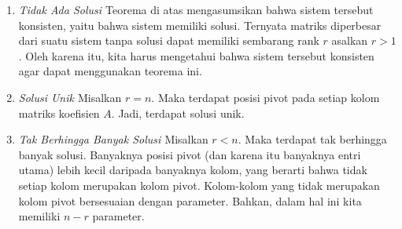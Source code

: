 \begin{enumerate}
\item {\em Tidak Ada Solusi \em}
Teorema di atas mengasumsikan bahwa sistem tersebut konsisten, yaitu bahwa sistem memiliki solusi. Ternyata matriks
diperbesar dari suatu sistem tanpa solusi dapat memiliki sembarang rank $r$ asalkan $r>1$. Oleh karena itu, kita harus mengetahui
bahwa sistem tersebut konsisten agar dapat menggunakan teorema ini.

\item {\em Solusi Unik \em}
Misalkan $r=n$. Maka terdapat posisi pivot pada setiap kolom matriks koefisien $A$. Jadi, terdapat solusi unik.

\item {\em Tak Berhingga Banyak Solusi \em}
Misalkan $r<n$. Maka terdapat tak berhingga banyak solusi. Banyaknya posisi pivot (dan karena itu banyaknya entri utama) lebih kecil daripada banyaknya kolom, yang berarti bahwa tidak setiap kolom merupakan kolom pivot. Kolom-kolom yang tidak merupakan kolom pivot bersesuaian dengan parameter. Bahkan,
dalam hal ini kita memiliki $n-r$ parameter.
\end{enumerate}
